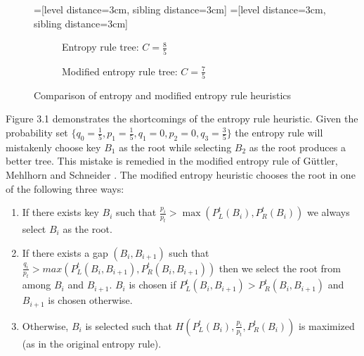 \documentclass[letterpaper,12pt,titlepage,oneside,final]{book}
\theoremstyle{plain}
\begin{document}
\begin{figure}[H]
\centering
=[level distance=3cm, sibling distance=3cm]
=[level distance=3cm, sibling distance=3cm]
\scriptsize
\begin{subfigure}{.46\textwidth}
\centering
{}
\caption{Entropy rule tree: $C=\frac{8}{5}$}
\end{subfigure}
\begin{subfigure}{.46\textwidth}
\centering
{}
\caption{Modified entropy rule tree: $C=\frac{7}{5}$}
\end{subfigure}
\caption{Comparison of entropy and modified entropy rule heuristics}
\end{figure}

Figure 3.1 demonstrates the shortcomings of the entropy rule heuristic. Given the probability set $\{q_0 = \frac{1}{5}, p_1 = \frac{1}{5}, q_1 = 0, p_2 = 0, q_3 = \frac{3}{5}\}$ the entropy rule will mistakenly choose key $B_1$ as the root while selecting $B_2$ as the root produces a better tree. This mistake is remedied in the modified entropy rule of G{\"u}ttler, Mehlhorn and Schneider \cite{guttler1980binary}. The modified entropy heuristic chooses the root in one of the following three ways:

\begin{enumerate}[label=\alph*)]
\item If there exists key $B_i$ such that $\frac{p_i}{p_t} > \max(P^t_L(B_i), P^t_R(B_i))$ we always select $B_i$ as the root.

\item If there exists a gap $(B_i, B_{i+1})$ such that $\frac{q_i}{p_t} > max(P^t_L(B_i, B_{i+1}), P^t_R(B_i, B_{i+1}))$ then we select the root from among $B_i$ and $B_{i+1}$. $B_i$ is chosen if $P^t_L(B_i, B_{i+1}) > P^t_R(B_i, B_{i+1})$ and $B_{i+1}$ is chosen otherwise.

\item Otherwise, $B_i$ is selected such that $H(P^t_L(B_i), \frac{p_i}{p_t}, P^t_R(B_i))$ is maximized (as in the original entropy rule).

\end{enumerate}
\end{document}
